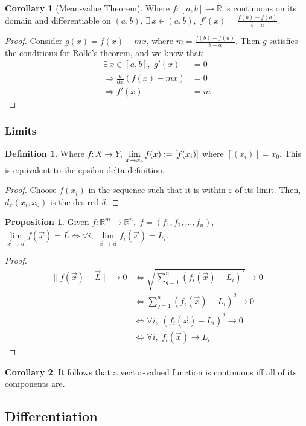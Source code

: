 \documentclass{article}
\newcommand{\vc}{\vcentcolon}
\theoremstyle{definition}
\newtheorem{defn}{Definition}[subsubsection]
\newtheorem{cor}{Corollary}[subsubsection]
\newtheorem{prop}{Proposition}[subsubsection]
\begin{document}
\begin{cor}[Mean-value Theorem]
	Where $f:[a,b]\rightarrow \mathbb{R}$ is continuous on its domain and differentiable on $(a,b)$, $\exists\,x\in (a,b),\;f'(x)=\frac{f(b)-f(a)}{b-a}$.
\end{cor}
\begin{proof}
	Consider $g(x)=f(x)-mx$, where $m=\frac{f(b)-f(a)}{b-a}$. Then $g$ satisfies the conditions for Rolle's theorem, and we know that:
	\begin{align*}
		\exists\,x\in [a,b],\;g'(x)&=0\\
		\Rightarrow\frac{d}{dx}(f(x)-mx)&=0\\
		\Rightarrow f'(x)&=m
	\end{align*}
\end{proof}
\newpage
\subsubsection{Limits}
\begin{defn}
	Where $f:X\rightarrow Y$, $\lim\limits_{x\rightarrow x_0}f(x)\vc=[f(x_i)]$ where $[(x_i)]=x_0$. This is equivalent to the epsilon-delta definition.
\end{defn}
\begin{proof}
	Choose $f(x_i)$ in the sequence such that it is within $\varepsilon$ of its limit. Then, $d_x(x_i,x_0)$ is the desired $\delta$.
\end{proof}
\begin{prop}
	Given $f:\mathbb{R}^m\rightarrow \mathbb{R}^n,\; f=(f_1,f_2,\dots,f_n)$, 
	$\lim\limits_{\vec x\rightarrow\vec a}f(\vec x)=\vec L\iff \forall i,\;\lim\limits_{\vec x\rightarrow\vec a}f_i(\vec x)=L_i.$
\end{prop}
\begin{proof}
	\begin{align*}
		\lVert f(\vec x)-\vec L\rVert\rightarrow0&\iff\sqrt{\sum_{q=1}^n(f_i(\vec x)-L_i)^2}\rightarrow0\\
		&\iff\sum_{q=1}^n(f_i(\vec x)-L_i)^2\rightarrow0\\
		&\iff\forall i,\;(f_i(\vec x)-L_i)^2\rightarrow0\tag*{(each term is positive)}\\
		&\iff\forall i,\;f_i(\vec x)\rightarrow L_i
	\end{align*}
\end{proof}
\begin{cor}
	It follows that a vector-valued function is continuous iff all of its components are.
\end{cor}
\subsection{Differentiation}
\end{document}
